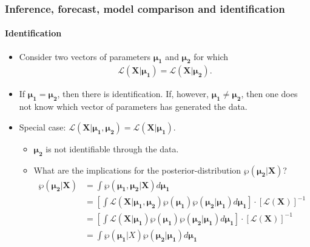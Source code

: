 \documentclass{beamer} %
\begin{document}
\begin{frame}\frametitle{Inference, forecast, model comparison and identification}\framesubtitle{Identification}
  \begin{itemize}
    \item Consider two vectors of parameters $\boldsymbol{\mu_1}$ and $\boldsymbol{\mu_2}$ for which
    \begin{align*}
    \mathcal{L}(\mathbf{X}|\boldsymbol{\mu_1}) = \mathcal{L}(\mathbf{X}|\boldsymbol{\mu_2}).
    \end{align*}
    \item If $\boldsymbol{\mu_1} = \boldsymbol{\mu_2}$, then there is identification. If, however, $\boldsymbol{\mu_1} \neq \boldsymbol{\mu_2}$, then one does not know which vector of parameters has generated the data.
    \item Special case: $\mathcal{L}(\mathbf{X}|\boldsymbol{\mu_1},\boldsymbol{\mu_2}) = \mathcal{L}(\mathbf{X}|\boldsymbol{\mu_1})$.
    \begin{itemize}
    \item $\boldsymbol{\mu_2}$ is not identifiable through the data.
    \item What are the implications for the posterior-distribution $\wp(\boldsymbol{\mu_2}|\mathbf{X})$?
    \scriptsize\begin{align*}
  \wp(\boldsymbol{\mu_2}|\mathbf{X}) &= \int \wp(\boldsymbol{\mu_1},\boldsymbol{\mu_2}|\mathbf{X}) d \boldsymbol{\mu_1}\\
  &=  \left[\int\mathcal{L}(\mathbf{X}|\boldsymbol{\mu_1},\boldsymbol{\mu_2})\wp(\boldsymbol{\mu_1})\wp(\boldsymbol{\mu_2}|\boldsymbol{\mu_1}) d \boldsymbol{\mu_1}\right] \cdot [\mathcal{L}(\mathbf{X})]^{-1}\\
  &=  \left[\int\mathcal{L}(\mathbf{X}|\boldsymbol{\mu_1})\wp(\boldsymbol{\mu_1})\wp(\boldsymbol{\mu_2}|\boldsymbol{\mu_1}) d \boldsymbol{\mu_1}\right] \cdot [\mathcal{L}(\mathbf{X})]^{-1}\\
  &= \int \wp(\boldsymbol{\mu_1}|X)\wp(\boldsymbol{\mu_2}|\boldsymbol{\mu_1})d \boldsymbol{\mu_1}
    \end{align*}
    \end{itemize}
  \end{itemize}
\end{frame}
\end{document}
